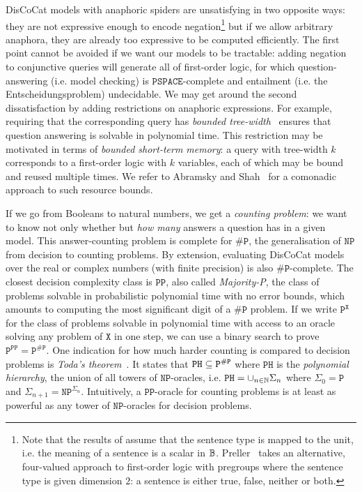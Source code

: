 DisCoCat models with anaphoric spiders are unsatisfying in two opposite ways: they are not expressive enough to encode negation\footnote
{Note that the results of \cite{FeliceEtAl19} assume that the sentence type is mapped to the unit, i.e. the meaning of a sentence is a scalar in $\mathbb{B}$.
Preller~\cite{Preller14a,Preller14} takes an alternative, four-valued approach to first-order logic with pregroups where the sentence type is given dimension $2$: a sentence is either true, false, neither or both.}
but if we allow arbitrary anaphora, they are already too expressive to be computed efficiently.
The first point cannot be avoided if we want our models to be tractable: adding negation to conjunctive queries will generate all of first-order logic, for which question-answering (i.e. model checking) is $\mathtt{PSPACE}$-complete and entailment (i.e. the Entscheidungsproblem) undecidable.
We may get around the second dissatisfaction by adding restrictions on anaphoric expressions.
For example, requiring that the corresponding query has \emph{bounded tree-width}~\cite{ChekuriRajaraman00} ensures that question answering is solvable in polynomial time.
This restriction may be motivated in terms of \emph{bounded short-term memory}: a query with tree-width $k$ corresponds to a first-order logic with $k$ variables, each of which may be bound and reused multiple times.
We refer to Abramsky and Shah~\cite{AbramskyShah21} for a comonadic approach to such resource bounds.

If we go from Booleans to natural numbers, we get a \emph{counting problem}: we want to know not only whether but \emph{how many} answers a question has in a given model.
This answer-counting problem is complete for $\mathtt{\#P}$, the generalisation of $\mathtt{NP}$ from decision to counting problems.
By extension, evaluating DisCoCat models over the real or complex numbers (with finite precision) is also $\mathtt{\#P}$-complete.
The closest decision complexity class is $\mathtt{PP}$, also called \emph{Majority-P}, the class of problems solvable in probabilistic polynomial time with no error bounds, which amounts to computing the most significant digit of a $\mathtt{\#P}$ problem.
If we write $\mathtt{P}^\mathtt{X}$ for the class of problems solvable in polynomial time with access to an oracle solving any problem of $\mathtt{X}$ in one step, we can use a binary search to prove $\mathtt{P}^\mathtt{PP} = \mathtt{P}^\mathtt{\#P}$.
One indication for how much harder counting is compared to decision problems is \emph{Toda's theorem}~\cite{Toda91}.
It states that $\mathtt{PH} \subseteq \mathtt{P}^\mathtt{\#P}$ where $\mathtt{PH}$ is the \emph{polynomial hierarchy}, the union of all towers of $\mathtt{NP}$-oracles, i.e. $\mathtt{PH} = \cup_{n \in \mathbb{N}} \Sigma_n$ where $\Sigma_0 = \mathtt{P}$ and $\Sigma_{n + 1} = \mathtt{NP}^{\Sigma_n}$.
Intuitively, a $\mathtt{PP}$-oracle for counting problems is at least as powerful as any tower of $\mathtt{NP}$-oracles for decision problems.

